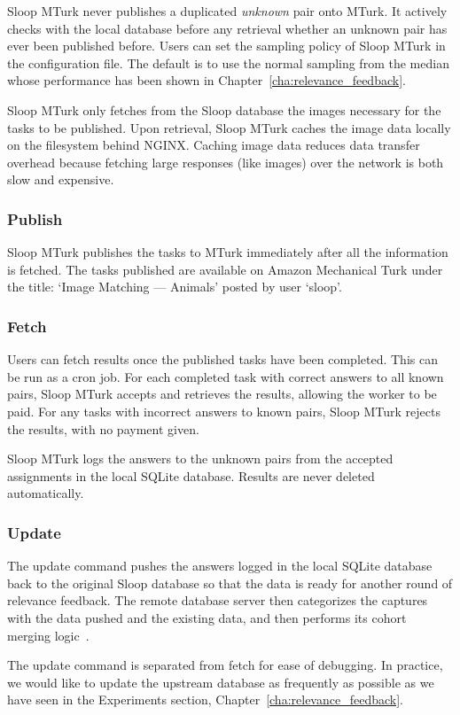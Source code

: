   Sloop MTurk never publishes a duplicated \emph{unknown} pair onto MTurk. It
  actively checks with the local database before any retrieval whether an unknown pair
  has ever been published before. Users can set the sampling policy of Sloop MTurk in
  the configuration file. The default is to use the normal sampling from the
  median whose performance has been shown in
  Chapter~\ref{cha:relevance_feedback}.

  Sloop MTurk only fetches from the Sloop database the images necessary for the
  tasks to be published.  Upon retrieval, Sloop MTurk caches the image data
  locally on the filesystem behind NGINX\@. Caching image data reduces data transfer
  overhead because fetching large responses (like images) over the network is
  both slow and expensive.

  \subsubsection{Publish}

  Sloop MTurk publishes the tasks to MTurk immediately after all the
  information is fetched. The tasks published are available on Amazon Mechanical
  Turk under the title: `Image Matching --- Animals' posted by user `sloop'.

  \subsubsection{Fetch}

  Users can fetch results once the published tasks have been completed. This can
  be run as a cron job.  For each completed task with correct answers to all
  known pairs, Sloop MTurk accepts and retrieves the results, allowing the worker
  to be paid.  For any tasks with incorrect answers to known pairs, Sloop MTurk
  rejects the results, with no payment given.

  Sloop MTurk logs the answers to the unknown pairs from the accepted assignments
  in the local SQLite database. Results are never deleted automatically.

  \subsubsection{Update}

  The update command pushes the answers logged in the local SQLite database back
  to the original Sloop database so that the data is ready for another round of
  relevance feedback. The remote database server then categorizes the captures
  with the data pushed and the existing data, and then performs its cohort
  merging logic~\cite{sloopdocs}.

  The update command is separated from fetch for ease of debugging. In
  practice, we would like to update the upstream database as frequently as
  possible as we have seen in the Experiments section,
  Chapter~\ref{cha:relevance_feedback}.


